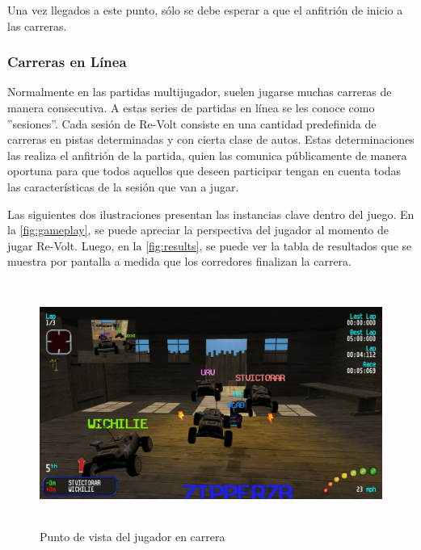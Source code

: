 Una vez llegados a este punto, sólo se debe esperar a que el anfitrión de inicio a las carreras.

\subsubsection{Carreras en Línea}
Normalmente en las partidas multijugador, suelen jugarse muchas carreras de manera consecutiva. A estas series de partidas en línea se les conoce como ''sesiones''. Cada sesión de Re-Volt consiste en una cantidad predefinida de carreras en pistas determinadas y con cierta clase de autos. Estas determinaciones las realiza el anfitrión de la partida, quien las comunica públicamente de manera oportuna para que todos aquellos que deseen participar tengan en cuenta todas las características de la sesión que van a jugar.

Las siguientes dos ilustraciones presentan las instancias clave dentro del juego. En la \autoref{fig:gameplay}, se puede apreciar la perspectiva del jugador al momento de jugar Re-Volt. Luego, en la \autoref{fig:results}, se puede ver la tabla de resultados que se muestra por pantalla a medida que los corredores finalizan la carrera.

\begin{figure}[H]
  \begin{center}
    \includegraphics[width=15cm, height=8cm]{img/gameplay.jpg}
  \end{center}
  \caption[Punto de vista del jugador en carrera]{Punto de vista del jugador en carrera}
  \label{fig:gameplay}
\end{figure}

